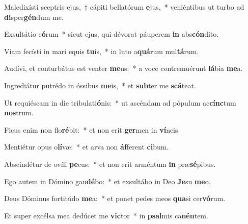 \item Maledixísti sceptris ejus,~† cápiti bellatórum \textbf{e}jus,~* veniéntibus ut turbo ad \textbf{di}sper\textbf{gén}dum me.
\item Exsultátio e\textbf{ó}rum~* sicut ejus, qui dévorat páuperem \textbf{in} abs\textbf{cón}dito.
\item Viam fecísti in mari equis \textbf{tu}is,~* in luto a\textbf{quá}rum mul\textbf{tá}rum.
\item Audívi, et conturbátus est venter \textbf{me}us:~* a voce contremuérunt \textbf{lá}bia \textbf{me}a.
\item Ingrediátur putrédo in óssibus \textbf{me}is,~* et \textbf{sub}ter me \textbf{scá}teat.
\item Ut requiéscam in die tribulati\textbf{ó}nis:~* ut ascéndam ad pópulum ac\textbf{cínc}tum \textbf{nos}trum.
\item Ficus enim non flo\textbf{ré}bit:~* et non erit \textbf{ger}men in \textbf{ví}neis.
\item Mentiétur opus o\textbf{lí}væ:~* et arva non \textbf{áf}ferent \textbf{ci}bum.
\item Abscindétur de ovíli \textbf{pe}cus:~* et non erit arméntum \textbf{in} præ\textbf{sé}pibus.
\item Ego autem in Dómino gau\textbf{dé}bo:~* et exsultábo in Deo \textbf{Je}su \textbf{me}o.
\item Deus Dóminus fortitúdo \textbf{me}a:~* et ponet pedes meos \textbf{qua}si cer\textbf{vó}rum.
\item Et super excélsa mea dedúcet me \textbf{vic}tor~* in \textbf{psal}mis ca\textbf{nén}tem.
